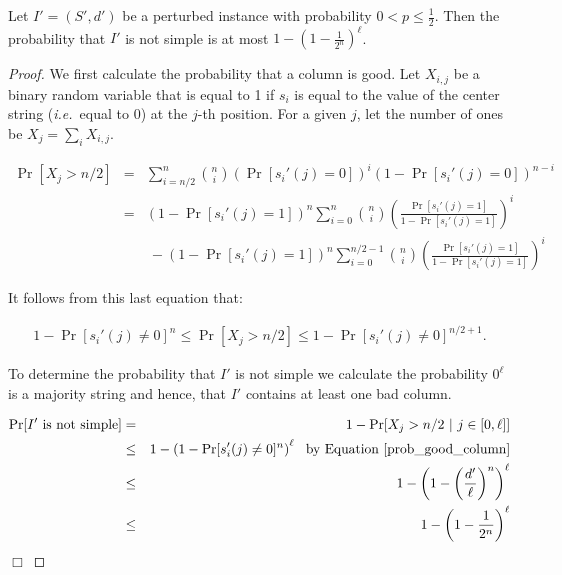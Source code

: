 \begin{lemma} \label{lem:simple} Let $I' = (S', d')$ be a perturbed instance with probability $0 < p \leq \frac{1}{2}$. Then the probability that $I'$ is not simple is at most $1 - \left( 1 - \frac{1}{2^n} \right)^{\ell}$.\end{lemma}

\begin{proof} We first calculate the probability that a column is good.  Let $X_{i, j}$ be a binary random variable that is equal to 1 if $s_i$ is equal to the value of the center string ({\em i.e.}\ equal to $0$) at the $j$-th position.  For a given $j$, let the number of ones be $X_j = \sum_{i} X_{i,j}$.  

\begin{eqnarray*}
\Pr[X_j > n/2] 	& = & \sum_{i = n/2}^n {n \choose i} \left(\Pr[s_i'(j) = 0]\right)^i \left(1 - \Pr[s_i'(j) = 0] \right)^{n - i} \\ 
						& = &(1 - \Pr[s_i'(j) = 1])^n  \sum_{i = 0}^n {n \choose i} \left(\frac{\Pr[s_i'(j) = 1]}{1 - \Pr[s_i'(j) = 1]} \right)^i  \\
						&~&~ - (1 - \Pr[s_i'(j) = 1])^n \sum_{i = 0}^{n/2 - 1} {n \choose i} \left(\frac{\Pr[s_i'(j) = 1]}{1 - \Pr[s_i'(j) = 1]} \right)^i 
\end{eqnarray*} 

It follows from this last equation that: 

\begin{eqnarray}\label{prob_good_column}
1  - \Pr[s_i'(j) \ne 0]^n	\leq  \Pr[X_j > n/2] 	 \leq 1  - \Pr[s_i'(j) \ne 0]^{n/2 + 1}. 
\end{eqnarray} 


To determine the probability that $I'$ is not simple we calculate the probability $0^{\ell}$ is a majority string and hence, that $I'$ contains at least one bad column.   

\begin{eqnarray*}
\Pr[I' \mbox{ is not simple}] 	& = & 1 - \Pr [X_j > n/2 \, \, |  \, \, j \in [0, \ell] ] \\ 
												& \leq & 1 -  \left( 1 - \Pr[s_i'(j) \ne 0]^n \right)^{\ell} \, \, \mbox{ by Equation \ref{prob_good_column}} \\
												& \leq & 1 - \left( 1  - \left(\frac{d'}{\ell}\right)^n\right)^{\ell} \\ 
												& \leq & 1 - \left( 1  - \frac{1}{2^n}\right)^{\ell}
\end{eqnarray*} \hfill  $\Box$ \end{proof}


